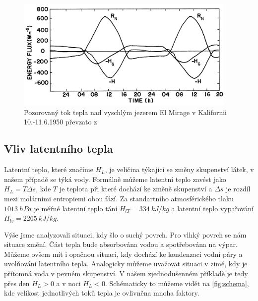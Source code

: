 \begin{figure}
	\centering
	\includegraphics[width=0.95\textwidth]{img/ch1/energy_drylakebed.png}
	\caption{Pozorovaný tok tepla nad vyschlým jezerem El Mirage v Kalifornii 10.-11.6.1950 převzato z \cite{arya2001}}
	\label{fig:energy_drylakebed}
\end{figure}

\subsection{Vliv latentního tepla}\label{chap:latentheat}
Latentní teplo, které značíme $H_L$, je veličina týkající se změny skupenství látek, v našem případě se týká vody. Formálně můžeme latentní teplo zavést jako $H_L = T\Delta s$, kde $T$ je teplota při které dochází ke změně skupenství a $\Delta s$ je rozdíl mezi molárními entropiemi obou fází\cite{callen1985}. Za standartního atmosférického tlaku $\SI{1013}{hPa}$ je měřné latentní teplo tání $H_{lT} = \SI{334}{kJ/kg}$ a latentní teplo vypařování $H_{lv} = \SI{2265}{kJ/kg}$. 

Výše jsme analyzovali situaci, kdy šlo o suchý povrch. Pro vlhký povrch se nám situace změní. Část tepla bude absorbována vodou a spotřebována na výpar. Můžeme ovšem mít i opačnou situaci, kdy dochází ke kondenzaci vodní páry a uvolňování latentního tepla. Analogicky můžeme uvažovat situaci v zimě, kdy je přítomná voda v pevném skupenství. V našem zjednodušenném příkladě je tedy přes den $H_L > 0$ a v noci $H_L < 0$. Schématicky to můžeme vidět na \ref{fig:schema}, kde velikost jednotlivých toků tepla je ovlivněna mnoha faktory\cite{arya2001}.

